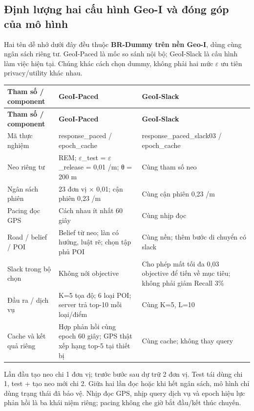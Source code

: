 \documentclass[10pt,a4paper]{article}
\begin{document}
\clearpage
\subsection{Định lượng hai cấu hình Geo-I và đóng góp của mô hình}\label{sub:2.1}
Hai tên dễ nhớ dưới đây đều thuộc \textbf{BR-Dummy trên nền Geo-I}, dùng cùng ngân sách riêng tư. GeoI-Paced là mốc so sánh nội bộ; GeoI-Slack là cấu hình làm việc hiện tại. Chúng khác cách chọn dummy, không phải hai mức $\varepsilon$ ưu tiên privacy/utility khác nhau.

\begingroup\small
\begin{longtable}{@{}P{3.938cm}P{6.350cm}P{6.350cm}@{}}
\toprule
\textbf{Tham số / component} & \textbf{GeoI-Paced} & \textbf{GeoI-Slack}\\\midrule
\endfirsthead
\toprule
\textbf{Tham số / component} & \textbf{GeoI-Paced} & \textbf{GeoI-Slack}\\\midrule
\endhead
\bottomrule\endfoot
Mã thực nghiệm & response\_\allowbreak{}paced / epoch\_\allowbreak{}cache & response\_\allowbreak{}paced\_\allowbreak{}slack03 / epoch\_\allowbreak{}cache\\
\addlinespace[3pt]
Neo riêng tư & REM; $\varepsilon$\_\allowbreak{}test = $\varepsilon$\_\allowbreak{}release = 0,01 /m; θ = 200 m & Cùng tham số neo\\
\addlinespace[3pt]
Ngân sách phiên & 23 đơn vị $\times$ 0,01; cận phiên 0,23 /m & Cùng cận phiên 0,23 /m\\
\addlinespace[3pt]
Pacing đọc GPS & Cách nhau ít nhất 60 giây & Cùng nhịp đọc\\
\addlinespace[3pt]
Road / belief / POI & Belief từ neo; làn có hướng, luật rẽ; chọn tập phủ POI & Cùng nền; thêm bước di chuyển có slack\\
\addlinespace[3pt]
Slack trong bộ chọn & Không nới objective & Cho phép mất tối đa 0,03 objective để tiến về mục tiêu; không phải giảm Recall 3\%\\
\addlinespace[3pt]
Đầu ra / dịch vụ & K=5 tọa độ; 6 loại POI; server trả top-10 mỗi loại/điểm & Cùng K=5, L=10\\
\addlinespace[3pt]
Cache và kết quả riêng & Hợp phản hồi cùng epoch 60 giây; GPS thật xếp hạng top-5 tại thiết bị & Cùng cache; không thay query\\
\end{longtable}
\endgroup
Lần đầu tạo neo chi 1 đơn vị; trước bước sau dự trữ 2 đơn vị. Test tái dùng chi 1, test + tạo neo mới chi 2. Giữa hai lần đọc hoặc khi hết ngân sách, mô hình chỉ dùng trạng thái đã bảo vệ. Nhịp đọc GPS, nhịp query dịch vụ và epoch hiệu lực phản hồi là ba khái niệm riêng; pacing không che giờ bắt đầu/kết thúc chuyến.
\end{document}

